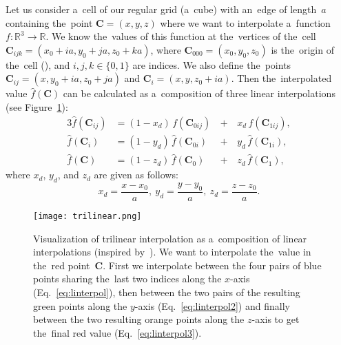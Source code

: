 				Let us consider a~cell of our regular grid (a~cube) with an~edge of length~$a$ containing the~point $\mathbf{C} = (x,y,z)$ where we want to interpolate a~function $f\colon\mathbb{R}^3\to\mathbb{R}$. We know the~values of this function at the~vertices of the~cell $\mathbf{C}_{ijk} = (x_0+ia,y_0+ja,z_0+ka)$, where $\mathbf{C}_{000} = (x_0,y_0,z_0)$ is the~origin of the~cell (), and $i,j,k \in \{0,1\}$ are indices. We also define the~points $\mathbf{C}_{ij} = (x,y_0+ia,z_0+ja)$ and $\mathbf{C}_i=(x,y,z_0+ia)$. Then the~interpolated value $\widehat{f}(\mathbf{C})$ can be calculated as a~composition of three linear interpolations (see Figure~\ref{fig:trilin}):
					\begin{alignat}{3}
						\label{eq:linterpol}
						\widehat{f}(\mathbf{C}_{ij}) &= (1-x_d)\,f(\mathbf{C}_{0ij}) \,&+&\,x_d\, f(\mathbf{C}_{1ij}),\\
						\label{eq:linterpol2}
						\widehat{f}(\mathbf{C}_{i}) &= (1-y_d)\,\widehat{f}(\mathbf{C}_{0i}) &+&\,y_d\, \widehat{f}(\mathbf{C}_{1i}),\\
						\label{eq:linterpol3}
						\widehat{f}(\mathbf{C}) &= (1-z_d)\,\widehat{f}(\mathbf{C}_0) &+&\,z_d\, \widehat{f}(\mathbf{C}_1),
					\end{alignat}
				where $x_d$, $y_d$, and $z_d$ are given as follows:
					\begin{equation}
						x_d = \frac{x-x_0}{a},~y_d = \frac{y-y_0}{a},~z_d = \frac{z-z_0}{a}.
					\end{equation}
					
				\begin{figure}
					\centering
					\texttt{[image: trilinear.png]}
					\caption{Visualization of trilinear interpolation as a~composition of linear interpolations (inspired by~\cite{trilinear1}). We want to interpolate the~value in the~red point~$\mathbf{C}$. First we interpolate between the four pairs of blue points sharing the~last two indices along the $x$\protect\nobreakdash-axis (Eq.~\ref{eq:linterpol}), then between the two pairs of the resulting green points along the $y$\protect\nobreakdash-axis (Eq.~\ref{eq:linterpol2}) and finally between the two resulting orange points along the $z$\protect\nobreakdash-axis to get the~final red value (Eq.~\ref{eq:linterpol3}).}
					\label{fig:trilin}
				\end{figure}
					
